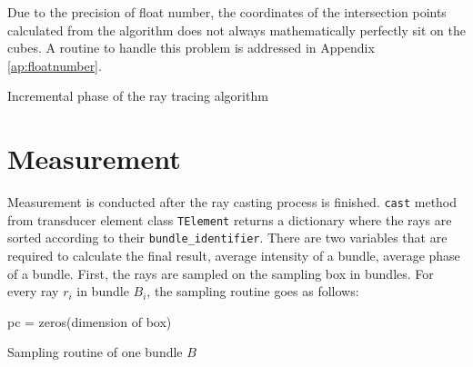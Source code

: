 Due to the precision of float number, the coordinates of the intersection points calculated from the algorithm does not always mathematically perfectly sit on the cubes. A routine to handle this problem is addressed in Appendix \ref{ap:floatnumber}.

\IncMargin{1em}
\begin{algorithm}[H] \label{algo:increment}
    \DontPrintSemicolon
    \caption{Incremental phase of the ray tracing algorithm}
\end{algorithm}
\DecMargin{1em}


\section{Measurement} \label{sec:measurement}
Measurement is conducted after the ray casting process is finished. \texttt{cast} method from transducer element class \texttt{TElement} returns a dictionary where the rays are sorted according to their \texttt{bundle\_identifier}. There are two variables that are required to calculate the final result, average intensity of a bundle, average phase of a bundle. First, the rays are sampled on the sampling box in bundles. For every ray $r_i$ in bundle $B_i$, the sampling routine goes as follows:

\IncMargin{1em}
\begin{algorithm}[H] \label{algo:sampling}
    \DontPrintSemicolon
    pc = zeros(dimension of box)\;
    \caption{Sampling routine of one bundle $B$}
\end{algorithm}
\DecMargin{1em}


